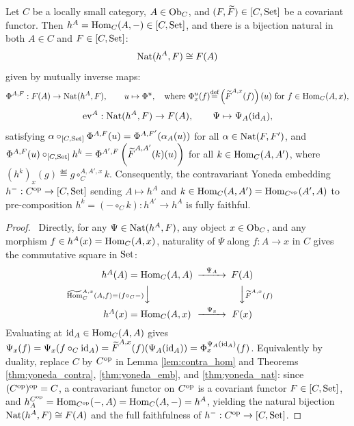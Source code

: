 \documentclass[10pt,a4paper]{article}
\renewcommand{\myprf}{\begin{proof}}
\renewcommand{\myqed}{\end{proof}}
\begin{document}
\begin{theorem}\label{thm:yoneda_cov}
Let $C$ be a locally small category, $A \in {\textrm{Ob}}_C$, and $(F, {\widetilde{F}\textrm{}}) \in [C, {\textrm{Set}}]$ be a covariant functor. Then $h^A = {\textrm{Hom}}_C(A, -) \in [C, {\textrm{Set}}]$, and there is a bijection natural in both $A \in C$ and $F \in [C, {\textrm{Set}}]$:
$${\textrm{Nat}}(h^A, F) \cong F(A)$$
given by mutually inverse maps:
$$\Phi^{A,F} : F(A) \to {\textrm{Nat}}(h^A, F), \qquad u \mapsto \Phi^u, \quad \textrm{where } \Phi^u_x(f) {\stackrel{{\textrm{def}}}{=}} \left({\widetilde{F}\textrm{}}^{A,x}(f)\right)(u) \textrm{ for } f \in {\textrm{Hom}}_C(A,x),$$
$$\mathrm{ev}^A : {\textrm{Nat}}(h^A, F) \to F(A), \qquad \Psi \mapsto \Psi_A({\textrm{id}}_A),$$
satisfying $\alpha \circ_{[C,{\textrm{Set}}]} \Phi^{A,F}(u) = \Phi^{A,F'}(\alpha_A(u))$ for all $\alpha \in {\textrm{Nat}}(F, F')$, and $\Phi^{A,F}(u) \circ_{[C,{\textrm{Set}}]} h^k = \Phi^{A',F}\left({\widetilde{F}\textrm{}}^{A,A'}(k)(u)\right)$ for all $k \in {\textrm{Hom}}_C(A, A')$, where $(h^k)_x(g) \eqdef g \circ_C^{A,A',x} k$.
Consequently, the contravariant Yoneda embedding $h^- : C^{\textrm{op}} \to [C, {\textrm{Set}}]$ sending $A \mapsto h^A$ and $k \in {\textrm{Hom}}_C(A,A') = {\textrm{Hom}}_{C^{\textrm{op}}}(A',A)$ to pre-composition $h^k = (- \circ_C k) : h^{A'} \to h^A$ is fully faithful.
\end{theorem}
\myprf\ Directly, for any $\Psi \in {\textrm{Nat}}(h^A, F)$, any object $x \in {\textrm{Ob}}_C$, and any morphism $f \in h^A(x) = {\textrm{Hom}}_C(A,x)$, naturality of $\Psi$ along $f : A \to x$ in $C$ gives the commutative square in ${\textrm{Set}}$:
$$\begin{CD}
h^A(A) = \Hom_C(A,A) @>{\Psi_A}>> F(A) \\
@V{\HomMor_C^{A,x}(A,f) = (f \circ_C -)}VV @VV{\FMor^{A,x}(f)}V \\
h^A(x) = \Hom_C(A,x) @>{\Psi_x}>> F(x)
\end{CD}$$
Evaluating at ${\textrm{id}}_A \in {\textrm{Hom}}_C(A,A)$ gives $\Psi_x(f) = \Psi_x(f \circ_C {\textrm{id}}_A) = {\widetilde{F}\textrm{}}^{A,x}(f)(\Psi_A({\textrm{id}}_A)) = \Phi^{\Psi_A({\textrm{id}}_A)}_x(f)$. Equivalently by duality, replace $C$ by $C^{\textrm{op}}$ in Lemma \ref{lem:contra_hom} and Theorems \ref{thm:yoneda_contra}, \ref{thm:yoneda_emb}, and \ref{thm:yoneda_nat}: since $(C^{\textrm{op}})^{\textrm{op}} = C$, a contravariant functor on $C^{\textrm{op}}$ is a covariant functor $F \in [C, {\textrm{Set}}]$, and $h_A^{C^{\textrm{op}}} = {\textrm{Hom}}_{C^{\textrm{op}}}(-, A) = {\textrm{Hom}}_C(A, -) = h^A$, yielding the natural bijection ${\textrm{Nat}}(h^A, F) \cong F(A)$ and the full faithfulness of $h^- : C^{\textrm{op}} \to [C, {\textrm{Set}}]$. \myqed
\end{document}
